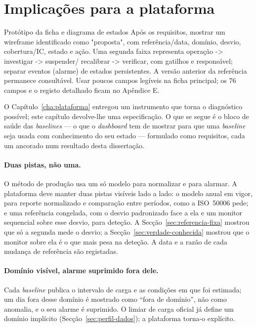 \section{Implicações para a plataforma}
\label{sec:implicacoes-plataforma}
{Protótipo da ficha e diagrama de estados}
{Após os requisitos, mostrar um wireframe identificado como "proposta",
com referência/data, domínio, desvio, cobertura/IC, estado e ação.
Uma segunda faixa representa operação -\textgreater{} investigar -\textgreater{} suspender/
recalibrar -\textgreater{} verificar, com gatilhos e responsável; separar eventos
(alarme) de estados persistentes. A versão anterior da referência
permanece consultável. Usar poucos campos legíveis na ficha principal;
os 76 campos e o registo detalhado ficam no Apêndice E.}%

O Capítulo~\ref{cha:plataforma} entregou um instrumento que torna o
diagnóstico possível; este capítulo devolve-lhe uma especificação. O que se
segue é o bloco de saúde das \emph{baselines} --- o que o \emph{dashboard}
tem de mostrar para que uma \emph{baseline} seja usada com conhecimento do
seu estado --- formulado como requisitos, cada um ancorado num resultado
desta dissertação.

\paragraph{Duas pistas, não uma.} O método de produção usa um só modelo para
normalizar e para alarmar. A plataforma deve manter duas pistas visíveis
lado a lado: o modelo anual em vigor, para reporte normalizado e comparação
entre períodos, como a ISO~50006 pede; e uma referência congelada, com o
desvio padronizado face a ela e um monitor sequencial sobre esse desvio,
para deteção. A Secção~\ref{sec:referencia-fixa} mostrou que só a segunda
mede o desvio; a Secção~\ref{sec:verdade-conhecida} mostrou que o monitor
sobre ela é o que mais pesa na deteção. A data e a razão de cada mudança de
referência são registadas.

\paragraph{Domínio visível, alarme suprimido fora dele.} Cada
\emph{baseline} publica o intervalo de carga e as condições em que foi
estimada; um dia fora desse domínio é mostrado como ``fora de domínio'', não
como anomalia, e o seu alarme é suprimido. O limiar de carga oficial já
define um domínio implícito (Secção~\ref{sec:perfil-dados}); a plataforma
torna-o explícito.

